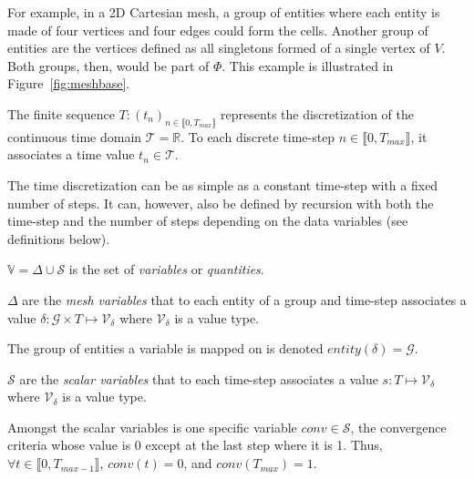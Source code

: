 For example, in a 2D Cartesian mesh, a group of entities where each entity is made of four vertices and four edges could form the cells.
Another group of entities are the vertices defined as all singletons formed of a single vertex of $V$. Both groups, then, would be part of $\Phi$. This example is illustrated in Figure~\ref{fig:meshbase}.

\medskip

\begin{mydef}
The finite sequence $T: (t_n)_{n\in\llbracket 0, T_{max} \rrbracket}$ represents the discretization of the continuous time domain $\mathcal{T}=\mathbb{R}$.
To each discrete time-step $n\in\llbracket 0, T_{max} \rrbracket$, it associates a time value $t_n\in\mathcal{T}$.
\end{mydef}

The time discretization can be as simple as a constant time-step with a fixed number of steps.
It can, however, also be defined by recursion with both the time-step and the number of steps depending on the data variables (see definitions below).

\medskip

\begin{mydefs}
\item $\mathbb{V}=\Delta\cup\mathcal{S}$ is the set of \emph{variables} or \emph{quantities}.
\item $\Delta$ are the \textit{mesh variables} that to each entity of a group and time-step associates a value $\delta: \mathcal{G}\times T\mapsto \mathcal{V}_\delta$ where $\mathcal{V}_{\delta}$ is a value type.
\item The group of entities a variable is mapped on is denoted $entity(\delta)=\mathcal{G}$.
\item $\mathcal{S}$ are the \textit{scalar variables} that to each time-step associates a value $s: T\mapsto \mathcal{V}_\delta$ where $\mathcal{V}_{\delta}$ is a value type.
\item Amongst the scalar variables is one specific variable $conv\in\mathcal{S}$, the convergence criteria whose value is $0$ except at the last step where it is 1. Thus, $\forall t\in \llbracket 0, T_{max-1} \rrbracket$, $conv(t)=0$, and $conv(T_{max})=1$.
\end{mydefs}


